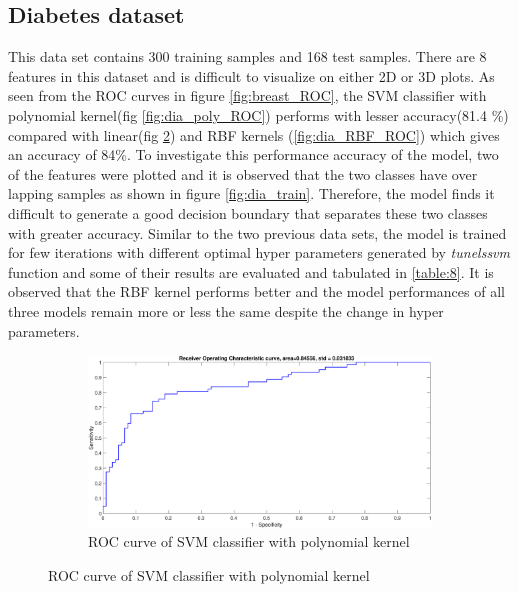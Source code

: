\documentclass[12pt]{report}
\begin{document}
{\subsection{Diabetes dataset}
This data set contains   300 training samples and 168  test samples. There are 8 features in this dataset and is difficult to visualize on either 2D or 3D plots. As seen from the ROC curves in figure \ref{fig:breast_ROC}, the SVM classifier with polynomial kernel(fig \ref{fig:dia_poly_ROC}) performs with lesser accuracy(81.4 \%) compared with linear(fig \ref{fig:dia_lin_ROC}) and RBF kernels (\ref{fig:dia_RBF_ROC}) which gives an accuracy of 84\%. To investigate this performance accuracy of the model, two of the features were plotted and it is observed that the two classes have over lapping samples as shown in figure \ref{fig:dia_train}. Therefore, the model finds it difficult to generate a good decision boundary that separates these two classes with greater accuracy. Similar to the two previous data sets, the model is trained for few iterations with different optimal hyper parameters generated by \textit{tunelssvm} function and some of their results are evaluated and tabulated in \ref{table:8}. It is observed that the RBF kernel performs better and
the model performances of all three models remain more or less the same despite the change in hyper parameters. 
\begin{figure}[!ht] 
	\centering
	\begin{subfigure}{.35\textwidth}
		\centering
		\captionsetup{width=0.8\linewidth}
		\includegraphics[height=.65\linewidth, width=0.9\linewidth]{diabetes/dia_lin_ROC.eps}
		\caption{ROC curve of SVM classifier with polynomial kernel}
		\label{fig:dia_lin_ROC}
	\end{subfigure}%

\end{figure}}
\end{document}
